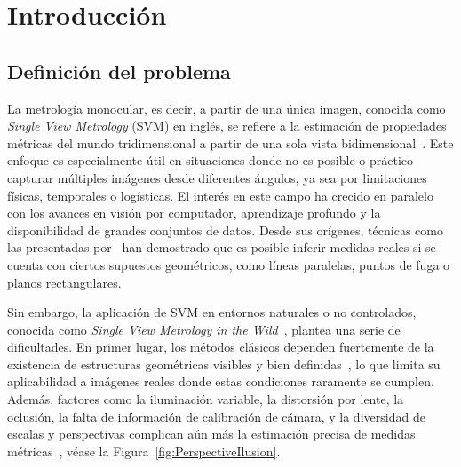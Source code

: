 \chapter{Introducción}
\section{Definición del problema}   
La metrología monocular, es decir, a partir de una única imagen, conocida como \emph{Single View Metrology} (SVM) en inglés, se 
refiere a la estimación de propiedades métricas del mundo tridimensional a partir de una sola vista bidimensional~\cite{VisionBookMIT,Hartley2004}. 
Este enfoque es especialmente útil en situaciones donde no es posible o práctico capturar múltiples imágenes desde diferentes ángulos, ya 
sea por limitaciones físicas, temporales o logísticas. El interés en este campo ha crecido en paralelo con los avances en visión 
por computador, aprendizaje profundo y la disponibilidad de grandes conjuntos de datos. Desde sus orígenes, técnicas 
como las presentadas por~\cite{CriminisiApplications, CriminisiReconstruction, CriminisiPaintings} han demostrado que es posible 
inferir medidas reales si se cuenta con ciertos supuestos geométricos, como líneas paralelas, puntos de fuga o planos rectangulares.
\par
Sin embargo, la aplicación de SVM en entornos naturales o no controlados, conocida como \emph{Single View Metrology in the Wild}~\cite{SVMIW}, 
plantea una serie de dificultades. En primer lugar, los métodos clásicos dependen fuertemente de la existencia de 
estructuras geométricas visibles y bien definidas~\cite{VisionBookMIT}, lo que limita su aplicabilidad a imágenes reales 
donde estas condiciones raramente se cumplen. Además, factores como la iluminación variable, la distorsión por lente, la oclusión, 
la falta de información de calibración de cámara, y la diversidad de escalas y perspectivas complican aún más la estimación precisa 
de medidas métricas~\cite{VisionBookMIT}, véase la Figura~\ref{fig:PerspectiveIlusion}.

